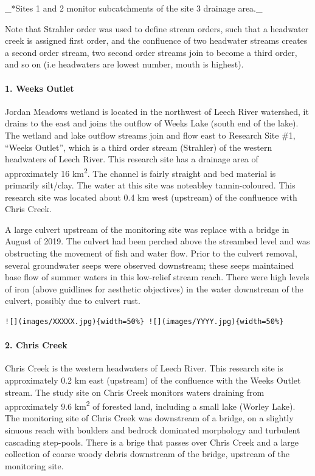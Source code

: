 \documentclass[]{article}
\let\oldparagraph\paragraph
\renewcommand{\paragraph}[1]{\oldparagraph{#1}\mbox{}}
\begin{document}
\_*Sites 1 and 2 monitor subcatchments of the site 3 drainage area.\_

Note that Strahler order was used to define stream orders, such that a
headwater creek is assigned first order, and the confluence of two
headwater streams creates a second order stream, two second order
streams join to become a third order, and so on (i.e headwaters are
lowest number, mouth is highest).

\paragraph{1. Weeks Outlet}\label{weeks-outlet}

Jordan Meadows wetland is located in the northwest of Leech River
watershed, it drains to the east and joins the outflow of Weeks Lake
(south end of the lake). The wetland and lake outflow streams join and
flow east to Research Site \#1, ``Weeks Outlet'', which is a third order
stream (Strahler) of the western headwaters of Leech River. This
research site has a drainage area of approximately 16
km\textsuperscript{2}. The channel is fairly straight and bed material
is primarily silt/clay. The water at this site was noteabley
tannin-coloured. This research site was located about 0.4 km west
(upstream) of the confluence with Chris Creek.

A large culvert upstream of the monitoring site was replace with a
bridge in August of 2019. The culvert had been perched above the
streambed level and was obstructing the movement of fish and water flow.
Prior to the culvert removal, several groundwater seeps were observed
downstream; these seeps maintained base flow of summer waters in this
low-relief stream reach. There were high levels of iron (above guidlines
for aesthetic objectives) in the water downstream of the culvert,
possibly due to culvert rust.

\begin{verbatim}
![](images/XXXXX.jpg){width=50%} ![](images/YYYY.jpg){width=50%}
\end{verbatim}

\paragraph{2. Chris Creek}\label{chris-creek}

Chris Creek is the western headwaters of Leech River. This research site
is approximately 0.2 km east (upstream) of the confluence with the Weeks
Outlet stream. The study site on Chris Creek monitors waters draining
from approximately 9.6 km\textsuperscript{2} of forested land, including
a small lake (Worley Lake). The monitoring site of Chris Creek was
downstream of a bridge, on a slightly sinuous reach with boulders and
bedrock dominated morphology and turbulent cascading step-pools. There
is a brige that passes over Chris Creek and a large collection of coarse
woody debris downstream of the bridge, upstream of the monitoring site.
\end{document}
